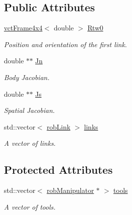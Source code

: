 \subsection*{Public Attributes}
\begin{DoxyCompactItemize}
\item 
\hyperlink{classvct_frame4x4}{vct\-Frame4x4}$<$ double $>$ \hyperlink{classrob_manipulator_ab48d9d9a166bf252698bc35788ca6ad6}{Rtw0}
\begin{DoxyCompactList}\small\item\em Position and orientation of the first link. \end{DoxyCompactList}\item 
double $\ast$$\ast$ \hyperlink{classrob_manipulator_a997ff4a6cabe644ff4dd4877d51e2fb4}{Jn}
\begin{DoxyCompactList}\small\item\em Body Jacobian. \end{DoxyCompactList}\item 
double $\ast$$\ast$ \hyperlink{classrob_manipulator_a5c8636fedd8f1a77ea297f87527cb85e}{Js}
\begin{DoxyCompactList}\small\item\em Spatial Jacobian. \end{DoxyCompactList}\item 
std\-::vector$<$ \hyperlink{classrob_link}{rob\-Link} $>$ \hyperlink{classrob_manipulator_a255e6fb341202762ad75a54c1d040eda}{links}
\begin{DoxyCompactList}\small\item\em A vector of links. \end{DoxyCompactList}\end{DoxyCompactItemize}
\subsection*{Protected Attributes}
\begin{DoxyCompactItemize}
\item 
std\-::vector$<$ \hyperlink{classrob_manipulator}{rob\-Manipulator} $\ast$ $>$ \hyperlink{classrob_manipulator_ae52a521233de4461f871291dbbe4858a}{tools}
\begin{DoxyCompactList}\small\item\em A vector of tools. \end{DoxyCompactList}\end{DoxyCompactItemize}


